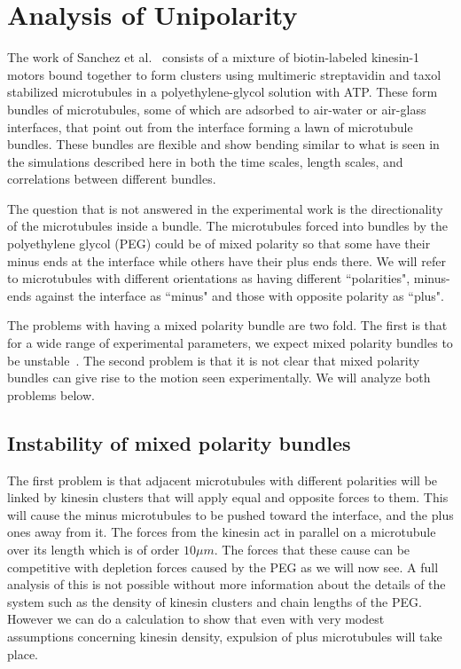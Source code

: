 \documentclass[11pt]{ucthesis}
\begin{document}
\section{Analysis of Unipolarity}
\label{app:unipolar}

The work of Sanchez et al.~\cite{Sanchez2011,sanchez2013engineering} consists of a mixture of 
biotin-labeled kinesin-1 motors bound together to form clusters using multimeric streptavidin
and taxol stabilized microtubules in a polyethylene-glycol solution with
ATP. These form bundles of microtubules, some of which are adsorbed to
air-water or air-glass interfaces, that point out from the interface forming a
lawn of microtubule bundles. These bundles are flexible and show bending similar
to what is seen in the simulations described here
in both the time scales, length scales, and correlations
between different bundles.

The question that is not answered in the experimental work is the directionality
of the microtubules inside a bundle. The microtubules forced into bundles by the polyethylene glycol (PEG)
could be of mixed polarity
so that some have their minus ends at the interface while others have their plus
ends there. We will refer to microtubules with different orientations as having
different ``polarities", minus-ends against the interface as ``minus" and those with opposite
polarity as ``plus". 

The problems with having a mixed polarity bundle are two fold. The first is
that for a wide range of experimental parameters, we expect mixed polarity 
bundles to be unstable~\cite{kruse2000actively,liverpool2003instabilities}. The second problem is that it is not clear that
mixed polarity bundles can give rise to the motion seen experimentally. We
will analyze both problems below.

\subsection{Instability of mixed polarity bundles}

The first problem is that adjacent
microtubules with different polarities will be linked by kinesin clusters that
will apply equal and opposite forces to them. This will cause the minus
microtubules to be pushed toward the interface, and the plus ones away from it. 
The forces from the kinesin act in parallel on a microtubule over its length
which is of order $10 \mu m$.
The forces that these cause can be competitive with depletion forces caused by the
PEG as we will now see.
A full analysis of this is not possible without more information
about the details of the system such as the density of kinesin clusters and chain
lengths of the PEG. However we can do a calculation to show that even with
very modest assumptions concerning kinesin density, expulsion of plus
microtubules will take place.
\end{document}
